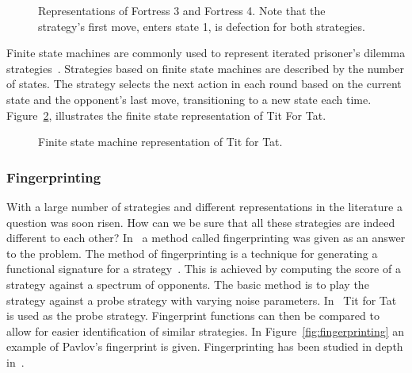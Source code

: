 \documentclass{article}
\begin{document}
\begin{figure}[!hbtp]
\centering
    \begin{subfigure}{.4\textwidth}
        
    \end{subfigure}
    \begin{subfigure}{.4\textwidth}\centering
        
     \end{subfigure}
     \caption{Representations of Fortress 3 and Fortress 4. Note that the
     strategy's first move, enters state 1, is defection for both strategies.}
     \label{fig:fortress3_and_4}
\end{figure}

Finite state machines are commonly used to represent iterated prisoner's
dilemma strategies~\cite{Miller1996, Rubinstein1986}. Strategies based on
finite state machines are described by the number of states.
The strategy selects the next action in each round based on the current state
and the opponent's last move, transitioning to a new state each time. Figure~\ref{fig:tit_for_tat_fsm},
illustrates the finite state representation of Tit For Tat.

\begin{figure}[!hbtp]
    \centering
    
    \caption{Finite state machine representation of Tit for Tat.}
    \label{fig:tit_for_tat_fsm}
\end{figure}

\subsubsection{Fingerprinting}

With a large number of strategies and different representations in the literature
a question was soon risen. How can we be sure that all these strategies are 
indeed different to each other? In~\cite{Ashlock2005} a method called 
fingerprinting was given as an answer to the problem. The method of 
fingerprinting is a technique for generating a functional signature for a 
strategy~\cite{Ashlock2008}. This is achieved by computing the score of a strategy
against a spectrum of opponents. The basic method is to play the strategy
against a probe strategy with varying noise parameters. In~\cite{Ashlock2005} 
Tit for Tat is used as the probe strategy. Fingerprint functions
can then be compared to allow for easier identification of similar strategies.
In Figure~\ref{fig:fingerprinting} an example of Pavlov's fingerprint is given.
Fingerprinting has been studied in depth in~\cite{Ashlock2008, Ashlock2009, 
Ashlock2010, Ashlock2006a}.
\end{document}

